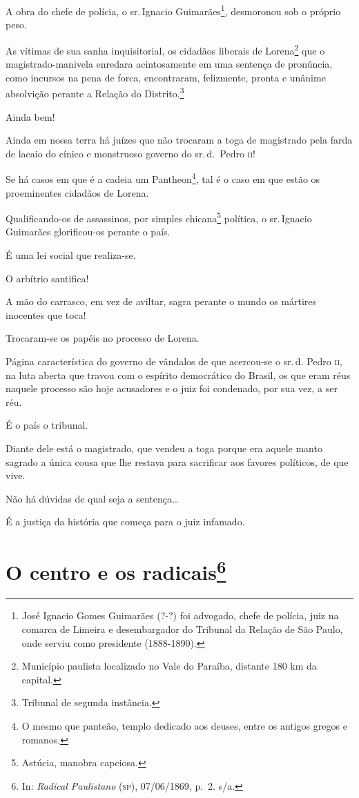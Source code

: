A obra do chefe de polícia, o sr.\,Ignacio Guimarães\footnote{José
  Ignacio Gomes Guimarães (?-?) foi advogado, chefe de polícia, juiz na
  comarca de Limeira e desembargador do Tribunal da Relação de São
  Paulo, onde serviu como presidente (1888-1890).}, desmoronou sob o
próprio peso.

As vítimas de sua sanha inquisitorial, os cidadãos liberais de
Lorena\footnote{Município paulista localizado no Vale do Paraíba,
  distante 180 km da capital.} que o magistrado-manivela enredara
acintosamente em uma sentença de pronúncia, como incursos na pena de
forca, encontraram, felizmente, pronta e unânime absolvição perante a
Relação do Distrito.\footnote{Tribunal de segunda instância.}

Ainda bem!

Ainda em nossa terra há juízes que não trocaram a toga de magistrado
pela farda de lacaio do cínico e monstruoso governo do sr.\,d.~Pedro \textsc{ii}!

Se há casos em que é a cadeia um Pantheon\footnote{O mesmo que
  panteão, templo dedicado aos deuses, entre os antigos gregos e
  romanos.}, tal é o caso em que estão os proeminentes cidadãos de
Lorena.

Qualificando-os de assassinos, por simples chicana\footnote{Astúcia,
  manobra capciosa.} política, o sr.\,Ignacio Guimarães glorificou-os
perante o país.

É uma lei social que realiza-se.

O arbítrio santifica!

A mão do carrasco, em vez de aviltar, sagra perante o mundo os mártires
inocentes que toca!

Trocaram-se os papéis no processo de Lorena.

Página característica do governo de vândalos de que acercou-se o sr.\,d.
Pedro \textsc{ii}, na luta aberta que travou com o espírito democrático do
Brasil, os que eram réus naquele processo são hoje acusadores e o juiz
foi condenado, por sua vez, a ser réu.

É o país o tribunal.

Diante dele está o magistrado, que vendeu a toga porque era aquele manto
sagrado a única cousa que lhe restava para sacrificar aos favores
políticos, de que vive.

Não há dúvidas de qual seja a sentença\ldots{}

É a justiça da história que começa para o juiz infamado.

\chapter{O centro e os radicais\footnote{In: \emph{Radical Paulistano}
  (\textsc{sp}), 07/06/1869, p.~2. s/a.}}

